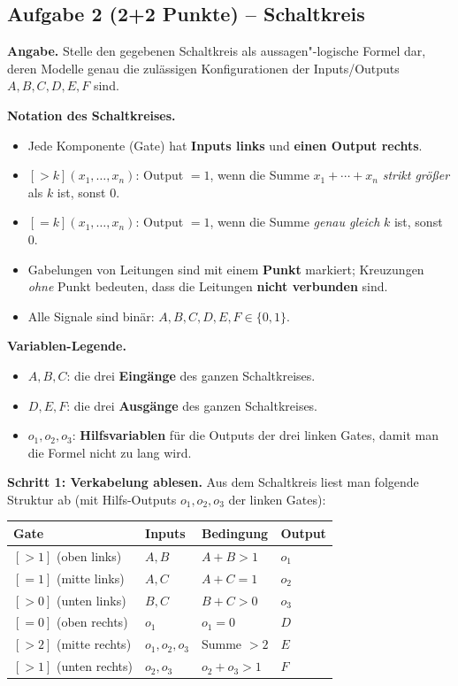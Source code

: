 \documentclass[a4paper,12pt]{article}
\begin{document}
\subsection*{Aufgabe 2 \textnormal{(2+2 Punkte)} -- Schaltkreis}

\textbf{Angabe.} Stelle den gegebenen Schaltkreis als aussagen"-logische
Formel dar, deren Modelle genau die zul\"assigen Konfigurationen der
Inputs/Outputs $A, B, C, D, E, F$ sind.

\medskip
\textbf{Notation des Schaltkreises.}
\begin{itemize}[nosep]
\item Jede Komponente (Gate) hat \textbf{Inputs links} und \textbf{einen Output rechts}.
\item $[>k](x_1, \ldots, x_n)$: Output $= 1$, wenn die Summe
      $x_1 + \cdots + x_n$ \emph{strikt gr\"o\ss er} als $k$ ist,
      sonst $0$.
\item $[=k](x_1, \ldots, x_n)$: Output $= 1$, wenn die Summe
      \emph{genau gleich} $k$ ist, sonst $0$.
\item Gabelungen von Leitungen sind mit einem \textbf{Punkt}
      markiert; Kreuzungen \emph{ohne} Punkt bedeuten, dass die
      Leitungen \textbf{nicht verbunden} sind.
\item Alle Signale sind bin\"ar: $A, B, C, D, E, F \in \{0, 1\}$.
\end{itemize}

\medskip
\textbf{Variablen-Legende.}
\begin{itemize}[nosep]
\item $A, B, C$: die drei \textbf{Eing\"ange} des ganzen Schaltkreises.
\item $D, E, F$: die drei \textbf{Ausg\"ange} des ganzen Schaltkreises.
\item $o_1, o_2, o_3$: \textbf{Hilfsvariablen} f\"ur die Outputs der
      drei linken Gates, damit man die Formel nicht zu lang wird.
\end{itemize}

\medskip
\textbf{Schritt 1: Verkabelung ablesen.}
Aus dem Schaltkreis liest man folgende Struktur ab (mit
Hilfs-Outputs $o_1, o_2, o_3$ der linken Gates):

\begin{center}
\renewcommand{\arraystretch}{1.3}
\begin{tabular}{l|l|l|l}
\toprule
Gate & Inputs & Bedingung & Output \\
\midrule
$[>1]$ (oben links) & $A, B$ & $A+B > 1$ & $o_1$ \\
$[=1]$ (mitte links) & $A, C$ & $A+C = 1$ & $o_2$ \\
$[>0]$ (unten links) & $B, C$ & $B+C > 0$ & $o_3$ \\
$[=0]$ (oben rechts) & $o_1$ & $o_1 = 0$ & $D$ \\
$[>2]$ (mitte rechts) & $o_1, o_2, o_3$ & Summe $> 2$ & $E$ \\
$[>1]$ (unten rechts) & $o_2, o_3$ & $o_2 + o_3 > 1$ & $F$ \\
\bottomrule
\end{tabular}
\end{center}
\end{document}

